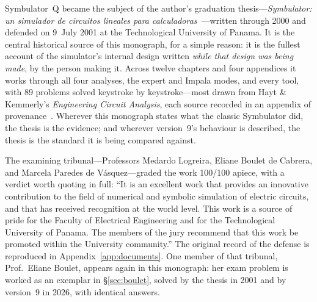\documentclass[11pt,oneside]{report}
\begin{document}
Symbulator~Q became the subject of the author's graduation
thesis---\emph{Symbulator: un simulador de circuitos lineales para
calculadoras}~\cite{thesis2000}---written through 2000 and defended
on 9~July 2001 at the Technological University of Panama. It is the
central historical source of this monograph, for a simple reason: it
is the fullest account of the simulator's internal design written
\emph{while that design was being made}, by the person making it.
Across twelve chapters and four appendices it works through all four
analyses, the expert and Impala modes, and every tool, with 89
problems solved keystroke by keystroke---most drawn from Hayt \&
Kemmerly's \emph{Engineering Circuit Analysis}, each source recorded
in an appendix of provenance~\cite[App.~D]{thesis2000}. Wherever
this monograph states what the classic Symbulator did, the thesis is
the evidence; and wherever version~9's behaviour is described, the
thesis is the standard it is being compared against.

The examining tribunal---Professors Medardo Logreira, Eliane Boulet
de Cabrera, and Marcela Paredes de V\'asquez---graded the work
100/100 apiece, with a verdict worth quoting in full: ``It is an
excellent work that provides an innovative contribution to the field
of numerical and symbolic simulation of electric circuits, and that
has received recognition at the world level. This work is a source
of pride for the Faculty of Electrical Engineering and for the
Technological University of Panama. The members of the jury
recommend that this work be promoted within the University
community.'' The original record of the defense is reproduced in
Appendix~\ref{app:documents}. One member of that tribunal, Prof.\
Eliane Boulet, appears again in this monograph: her exam problem is
worked as an exemplar in \S\ref{sec:boulet}, solved by the thesis in
2001 and by version~9 in 2026, with identical answers.
\end{document}
